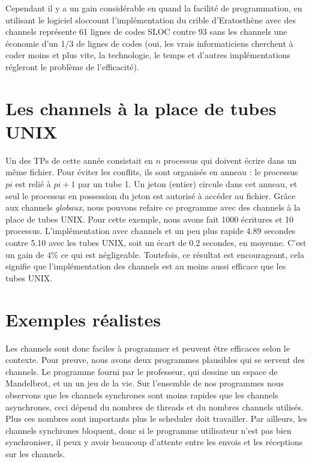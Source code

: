 \documentclass[a4paper]{report}
\begin{document}
Cependant il y a un gain considérable en quand la facilité de programmation, en utilisant le logiciel sloccount l'implémentation du crible d'Eratosthène avec des channels représente 61 lignes de codes SLOC contre 93 sans les channels une économie d'un 1/3 de lignes de codes (oui, les vrais informaticiens cherchent à coder moins et plus vite, la technologie, le temps et d'autres implémentations régleront le problème de l'efficacité).
\section{Les channels à la place de tubes UNIX}
Un des TPs de cette année consistait en $n$ processus qui doivent écrire dans un même fichier. Pour éviter les conflits, ils sont organisés en anneau : le processus $pi$ est relié à $pi+1$ par un tube 1. Un jeton (entier) circule dans cet anneau, et seul le processus en possession du jeton est autorisé à accéder au fichier. Grâce aux channels \emph{globaux}, nous pouvons refaire ce programme avec des channels à la place de tubes UNIX. Pour cette exemple, nous avons fait 1000 écritures et 10 processus. L'implémentation avec channels et un peu plus rapide 4.89 secondes contre 5.10 avec les tubes UNIX, soit un écart de 0.2 secondes, en moyenne. C'est un gain de $4\%$ ce qui est négligeable. Toutefois, ce résultat est encourageant, cela signifie que l'implémentation des channels est au moins aussi efficace que les tubes UNIX.
\section{Exemples réalistes}
Les channels sont donc faciles à programmer et peuvent être efficaces selon le contexte. Pour preuve, nous avons deux programmes plausibles qui se servent des channels. Le programme fourni par le professeur, qui dessine un espace de Mandelbrot, et un un jeu de la vie. Sur l'ensemble de nos programmes nous observons que les channels synchrones sont moins rapides que les channels asynchrones, ceci dépend du nombres de threads et du nombres channels utilisés. Plus ces nombres sont importants plus le scheduler doit travailler. Par ailleurs, les channels synchrones bloquent, donc si le programme utilisateur n'est pas bien synchroniser, il peux y avoir beaucoup d'attente entre les envois et les réceptions sur les channels.
\end{document}
